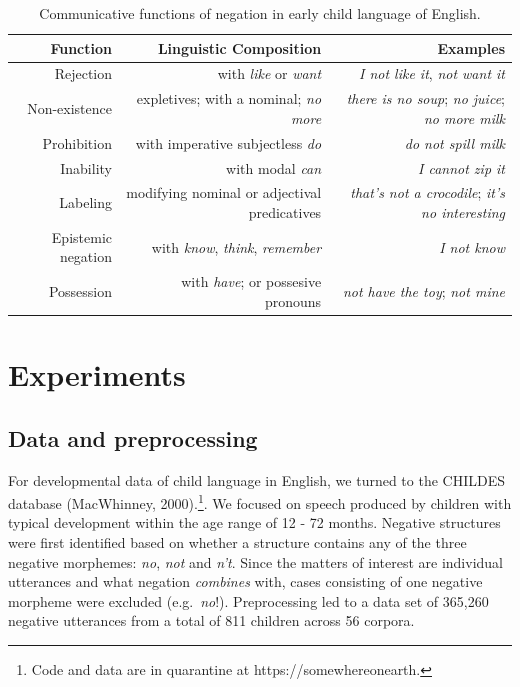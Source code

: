 \documentclass[10pt, letterpaper]{article}
\begin{document}
\begin{table}[h]
\small
\centering
\begin{tabular}{rrr}
  \hline
 \textbf{Function} & \textbf{Linguistic Composition} & \textbf{Examples} \\
  \hline
Rejection & with \textit{like} or \textit{want} & \textit{I not like it}, \textit{not want it}  \\
Non-existence & expletives; with a nominal; \textit{no more} & \textit{there is no soup}; \textit{no juice}; \textit{no more milk} \\
Prohibition & with imperative subjectless \textit{do} & \textit{do not spill milk} \\
Inability & with modal \textit{can} & \textit{I cannot zip it} \\
Labeling & modifying nominal or adjectival predicatives & \textit{that's not a crocodile}; \textit{it's no interesting} \\
Epistemic negation & with \textit{know}, \textit{think}, \textit{remember}  & \textit{I not know} \\
Possession & with \textit{have}; or possesive pronouns & \textit{not have the toy}; \textit{not mine} \\
   \hline
\end{tabular}
\caption{Communicative functions of negation in early child language of English.}
\end{table}

\hypertarget{experiments}{%
\section{Experiments}\label{experiments}}

\hypertarget{data-and-preprocessing}{%
\subsection{Data and preprocessing}\label{data-and-preprocessing}}

For developmental data of child language in English, we turned to the
CHILDES database (MacWhinney,
2000).\footnote{Code and data are in quarantine at https://somewhereonearth.}.
We focused on speech produced by children with typical development
within the age range of 12 - 72 months. Negative structures were first
identified based on whether a structure contains any of the three
negative morphemes: \emph{no}, \emph{not} and \emph{n't}. Since the
matters of interest are individual utterances and what negation
\emph{combines} with, cases consisting of one negative morpheme were
excluded (e.g.~\emph{no}!). Preprocessing led to a data set of 365,260
negative utterances from a total of 811 children across 56 corpora.
\end{document}
